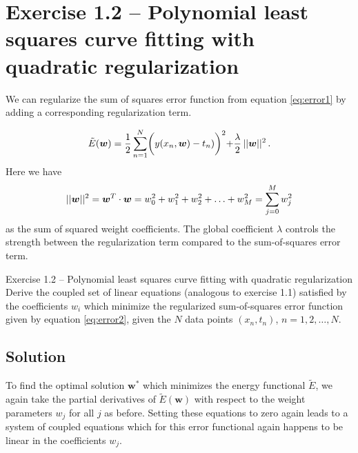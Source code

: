 \documentclass[11pt, DINA4, fleqn]{amsart}
\def\vw{\boldsymbol{w}\xspace}
\begin{document}
\section*{Exercise 1.2 -- Polynomial least squares curve fitting with quadratic regularization}
We can regularize the sum of squares error function from equation \eqref{eq:error1} by adding a corresponding regularization term. 

\begin{align}
\tilde{E}(\vw) = \dfrac{1}{2} \sum \displaylimits_{n = 1}^{N}
\biggl(y(x_n, \vw) - t_n)\biggl)^2 + \dfrac{\lambda}{2} \, || \vw ||^2 \, .
\label{eq:error2}
\end{align}
Here we have
\begin{align}
||\vw||^2 = \vw^T \cdot \vw  = w_0^2 + w_1^2 + w_2^2 + \dotsc +  w_M^2 = \sum \displaylimits_{j = 0}^{M} w_j^2
\end{align}
as the sum of squared weight coefficients. The global coefficient $\lambda$ controls the strength between the regularization term compared to the sum-of-squares error term.

\begin{mybox_tc3}{Exercise 1.2 -- Polynomial least squares curve fitting with quadratic regularization}
	Derive the coupled set of linear equations (analogous to exercise 1.1) satisfied by the coefficients
	$w_i$ which minimize the regularized sum-of-squares error function given by equation \eqref{eq:error2}, given the $N$ data points $(x_n, t_n)$, $n = 1, 2, \dotsc, N$.
\end{mybox_tc3}

\subsection*{Solution}
To find the optimal solution $\vw^*$ which minimizes the energy functional $\tilde{E}$, we again take the partial derivatives of $\tilde{E}(\vw)$ with respect to the weight parameters $w_j$ for all $j$ as before.
Setting these equations to zero again leads to a system of coupled equations which for this error functional again happens to be linear in the coefficients $w_j$.
\end{document}
